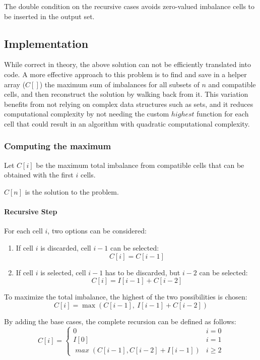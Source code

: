 The double condition on the recursive cases avoids zero-valued imbalance cells to be inserted in the output set.

\subsection{Implementation}

While correct in theory, the above solution can not be efficiently translated into code. A more effective approach to this problem is to find and save in a helper array ($C[]$) the maximum sum of imbalances for all subsets of $n$ and compatible cells, and then reconstruct the solution by walking back from it. This variation benefits from not relying on complex data structures such as sets, and it reduces computational complexity by not needing the custom $\mathit{highest}$ function for each cell that could result in an algorithm with quadratic computational complexity.

\subsubsection{Computing the maximum}
Let $C[i]$ be the maximum total imbalance from compatible cells that can be obtained with the first $i$ cells.

$C[n]$ is the solution to the problem.

\paragraph{Recursive Step}

For each cell $i$, two options can be considered:
\begin{enumerate}
    \item If cell $i$ is discarded, cell $i-1$ can be selected:
          \[
              C[i]=C[i-1]
          \]

    \item If cell $i$ is selected, cell $i-1$ has to be discarded, but $i-2$ can be selected:
          \[
              C[i]=I[i-1]+C[i-2]
          \]
\end{enumerate}

To maximize the total imbalance, the highest of the two possibilities is chosen:
\[
    C[i]=\max(C[i-1],\ I[i-1] + C[i-2])
\]

By adding the base cases, the complete recursion can be defined as follows:
\[
    C[i] = \begin{cases}
        0                                      & i=0      \\
        I[0]                                   & i=1      \\
        \mathit{\max}(C[i-1], C[i-2] + I[i-1]) & i \geq 2
    \end{cases}
\]

